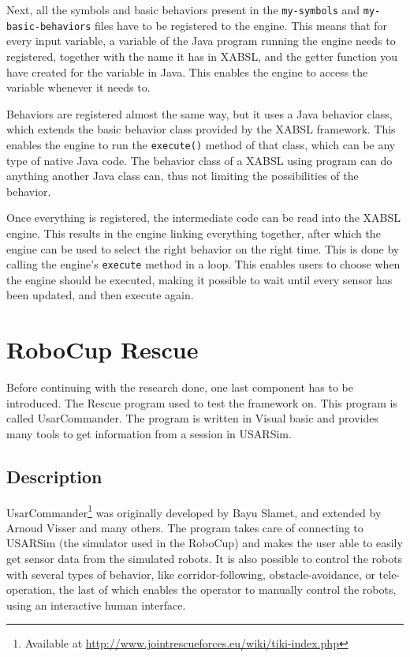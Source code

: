 \documentclass[a4paper,10pt]{article}
\begin{document}
Next, all the symbols and basic behaviors present in the \texttt{my-symbols} and
\texttt{my-basic-behaviors} files have to be registered to the engine. This
means that for every input variable, a variable of the Java program running the
engine needs to registered, together with the name it has in XABSL, and the
getter function you have created for the variable in Java. This enables the
engine to access the variable whenever it needs to. 

Behaviors are registered almost the same way, but it uses a Java behavior class,
which extends the basic behavior class provided by the XABSL framework. This
enables the engine to run the \texttt{execute()} method of that class, which can
be any type of native Java code. The behavior class of a XABSL using program can
do anything another Java class can, thus not limiting the possibilities of the
behavior. 

Once everything is registered, the intermediate code can be read into the XABSL
engine. This results in the engine linking everything together, after which the
engine can be used to select the right behavior on the right time. This is done
by calling the engine's \texttt{execute} method in a loop. This enables users to
choose when the engine should be executed, making it possible to wait until
every sensor has been updated, and then execute again.

\section{RoboCup Rescue}
Before continuing with the research done, one last component has to be
introduced. The Rescue program used to test the framework on. This program is
called UsarCommander. The program is written in Visual basic and provides many
tools to get information from a session in USARSim.

\subsection{Description}
UsarCommander\footnote{Available at
\url{http://www.jointrescueforces.eu/wiki/tiki-index.php}} was originally developed by Bayu Slamet, and extended by Arnoud
Visser and many others. The program takes care of connecting to USARSim (the
simulator used in the RoboCup) and
makes the user able to easily get sensor data from the simulated robots. It is also
possible to control the robots with several types of behavior, like
corridor-following, obstacle-avoidance, or tele-operation, the last of which
enables the operator to manually control the robots, using an
interactive human interface.
\end{document}
